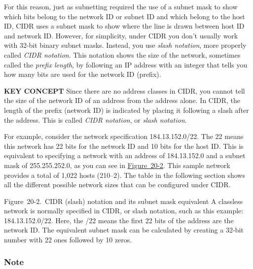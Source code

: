 \documentclass[b5paper,11pt]{memoir}
\begin{document}
For this reason, just as subnetting required the use of a subnet mask to
show which bits belong to the network ID or subnet ID and which belong
to the host ID, CIDR uses a subnet mask to show where the line is drawn
between host ID and network ID. However, for simplicity, under CIDR you
don't usually work with 32-bit binary subnet masks. Instead, you use
{\emph{slash notation}}, more properly called {\emph{CIDR notation}}.
This notation shows the size of the network, sometimes called the
\protect\hypertarget{ch20s02.htmlux5cux23idx-CHP-20-0765}{}{}{\emph{prefix
length}}, by following an IP address with an integer that tells you how
many bits are used for the network ID (prefix).


{\textbf{KEY CONCEPT}} Since there are no address classes in CIDR, you
cannot tell the size of the network ID of an address from the address
alone. In CIDR, the length of the prefix (network ID) is indicated by
placing it following a
\protect\hypertarget{ch20s02.htmlux5cux23idx-CHP-20-0766}{}{}slash after
the address. This is called
\protect\hypertarget{ch20s02.htmlux5cux23idx-CHP-20-0767}{}{}{\emph{CIDR
notation}}, or {\emph{slash notation}}.

For example, consider the network specification 184.13.152.0/22. The 22
means this network has 22 bits for the network ID and 10 bits for the
host ID. This is equivalent to specifying a network with an address of
184.13.152.0 and a subnet mask of 255.255.252.0, as you can see in
\protect\hyperlink{ch20s02.htmlux5cux23cidr_slash_notation_and_its_subnet_mask_}{Figure~20-2}.
This sample network provides a total of 1,022 hosts (210--2). The table
in the following section shows all the different possible network sizes
that can be configured under CIDR.

\protect\hypertarget{ch20s02.htmlux5cux23cidr_slash_notation_and_its_subnet_mask_}{}{}

\protect\hypertarget{ch20s02.htmlux5cux23I_mediaobject6_d1e21549}{}{}

Figure~20-2.~CIDR (slash) notation and its subnet mask equivalent A
classless network is normally specified in CIDR, or slash notation, such
as this example: 184.13.152.0/22. Here, the /22 means the first 22 bits
of the address are the network ID. The equivalent subnet mask can be
calculated by creating a 32-bit number with 22 ones followed by 10
zeros.

\subsubsection[Note]{\texorpdfstring{\protect\hypertarget{ch20s02.htmlux5cux23note-79}{}{}Note}{Note}}
\end{document}
